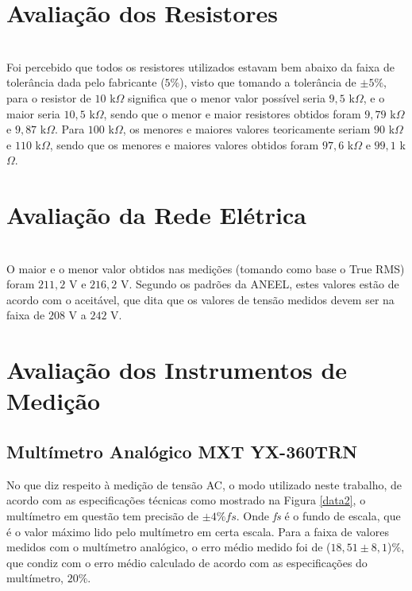 \documentclass[14pt, oneside]{book}
\newcommand\tab[1][1cm]{\hspace*{#1}}
\theoremstyle{definition}
\begin{document}
            \section{Avaliação dos Resistores}
              \\
                \tab Foi percebido que todos os resistores utilizados estavam bem abaixo da faixa de tolerância dada pelo fabricante ($5\%$), visto que tomando a tolerância de $\pm5\%$, para o resistor de $10$ k$\Omega$ significa que o menor valor possível seria $9,5$ k$\Omega$, e o maior seria $10,5$ k$\Omega$, sendo que o menor e maior resistores obtidos foram $9,79$ k$\Omega$ e $9,87$ k$\Omega$. Para $100$ k$\Omega$, os menores e maiores valores teoricamente seriam $90$ k$\Omega$ e $110$ k$\Omega$, sendo que os menores e maiores valores obtidos foram $97,6$ k$\Omega$ e $99,1$ k$\Omega$.
            
            \section{Avaliação da Rede Elétrica}
            \\
                \tab O maior e o menor valor obtidos nas medições (tomando como base o True RMS) foram $211,2$ V e $216,2$ V. Segundo os padrões da ANEEL, estes valores estão de acordo com o aceitável, que dita que os valores de tensão medidos devem ser na faixa de $208$ V a $242$ V.
                
            \section{Avaliação dos Instrumentos de Medição}
            
                \subsection{Multímetro Analógico MXT YX-360TRN}
                    \tab No que diz respeito à medição de tensão AC, o modo utilizado neste trabalho, de acordo com as especificações técnicas como mostrado na Figura \ref{data2}, o multímetro em questão tem precisão de $\pm 4\%  fs$.
                    Onde \textit{fs} é o fundo de escala, que é o valor máximo lido pelo multímetro em certa escala.
                    Para a faixa de valores medidos com o multímetro analógico, o erro médio medido foi de
                    ($18,51\pm 8,1$)\%, que condiz com o erro médio calculado de acordo com as especificações do
                    multímetro, $20\%$.
                    
\end{document}
